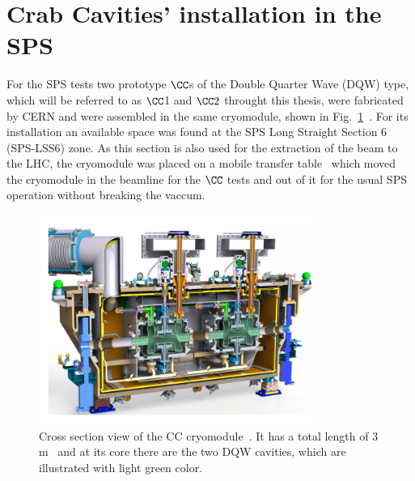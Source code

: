 \section{Crab Cavities' installation in the SPS}\label{sec:cc_sps_installation}
For the SPS tests two prototype $\CC$s of the Double Quarter Wave (DQW) type, which will be referred to as $\CC$1 and $\CC2$ throught this thesis, were fabricated by CERN and were assembled in the same cryomodule, shown in Fig.~\ref{fig:DQW_cryomodule}~\cite{Zanoni:2017}. For its installation an available space was found at the SPS Long Straight Section 6 (SPS-LSS6) zone. As this section is also used for the extraction of the beam to the LHC, the cryomodule was placed on a mobile transfer table~\cite{Calaga:2649807} which  moved the cryomodule in the beamline for the $\CC$ tests and out of it for the usual SPS operation without breaking the vaccum.

\begin{figure}[h]
   \centering         
   \includegraphics[width=0.8\textwidth]{images/Ch4/CC_cryomodule.png}
       \caption{Cross section view of the CC cryomodule~\cite{Zanoni:2017}. It has a total length of 3\,m~\cite{Baudrenghien:1520896} and at its core there are the two DQW cavities, which are illustrated with light green color.}
       \label{fig:DQW_cryomodule}
\end{figure}


